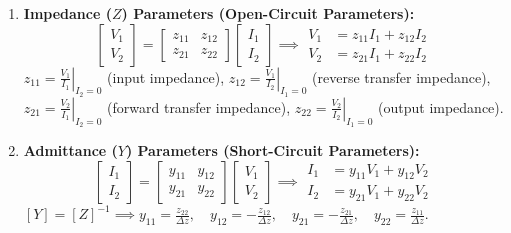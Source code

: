 \documentclass[12pt,a4paper]{article}
\begin{document}
\begin{tcolorbox}[defbox, title={\textbf{Definitions and Equations of Two-Port Parameter Sets}}]
\begin{enumerate}[leftmargin=*, itemsep=4pt]
  \item \textbf{Impedance ($Z$) Parameters (Open-Circuit Parameters):}
  \begin{equation}
    \begin{bmatrix} V_1 \\ V_2 \end{bmatrix} = \begin{bmatrix} z_{11} & z_{12} \\ z_{21} & z_{22} \end{bmatrix} \begin{bmatrix} I_1 \\ I_2 \end{bmatrix} \implies \begin{aligned} V_1 &= z_{11} I_1 + z_{12} I_2 \\ V_2 &= z_{21} I_1 + z_{22} I_2 \end{aligned}
  \end{equation}
  $z_{11} = \left.\frac{V_1}{I_1}\right|_{I_2=0}$ (input impedance), $z_{12} = \left.\frac{V_1}{I_2}\right|_{I_1=0}$ (reverse transfer impedance),\\
  $z_{21} = \left.\frac{V_2}{I_1}\right|_{I_2=0}$ (forward transfer impedance), $z_{22} = \left.\frac{V_2}{I_2}\right|_{I_1=0}$ (output impedance).

  \item \textbf{Admittance ($Y$) Parameters (Short-Circuit Parameters):}
  \begin{equation}
    \begin{bmatrix} I_1 \\ I_2 \end{bmatrix} = \begin{bmatrix} y_{11} & y_{12} \\ y_{21} & y_{22} \end{bmatrix} \begin{bmatrix} V_1 \\ V_2 \end{bmatrix} \implies \begin{aligned} I_1 &= y_{11} V_1 + y_{12} V_2 \\ I_2 &= y_{21} V_1 + y_{22} V_2 \end{aligned}
  \end{equation}
  $[Y] = [Z]^{-1} \implies y_{11} = \frac{z_{22}}{\Delta z}, \quad y_{12} = -\frac{z_{12}}{\Delta z}, \quad y_{21} = -\frac{z_{21}}{\Delta z}, \quad y_{22} = \frac{z_{11}}{\Delta z}$.


\end{enumerate}
\end{tcolorbox}
\end{document}
